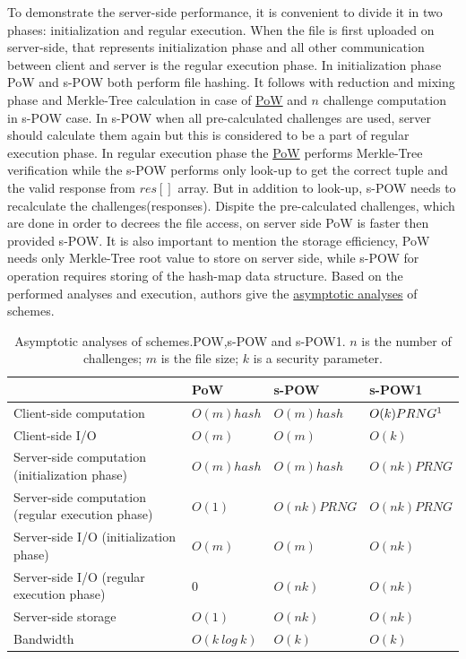 \documentclass[12pt]{article}
\begin{document}
To demonstrate the server-side performance, it is convenient to divide it in two phases: initialization and regular execution. When the file is first uploaded on server-side, that represents initialization phase and all other communication between client and server is the regular execution phase. In initialization phase PoW and s-POW both perform file hashing. It follows with reduction and mixing phase and Merkle-Tree calculation in case of  \hyperref[sub:Soltuion1]{PoW} and $n$ challenge computation in s-POW case. In s-POW when all pre-calculated challenges are used, server should calculate them again but this is considered to be a part of regular execution phase. In regular execution phase the  \hyperref[sub:Soltuion1]{PoW}  performs Merkle-Tree verification while the s-POW performs only look-up to get the correct tuple and the valid response from $res[]$  array. But in addition to look-up, s-POW needs to recalculate the challenges(responses). Dispite the pre-calculated challenges, which are done in order to decrees the file access, on server side PoW is faster then provided s-POW. It is also important to mention the storage efficiency, PoW needs only Merkle-Tree root value to store on server side, while s-POW for operation requires storing of the hash-map data structure.  Based on the performed analyses and execution, authors give the \hyperref[table:asymptoticAnalysis]{asymptotic analyses} of schemes. 


\begin{savenotes}
\begin{table}[!htpb]
\centering
\addtolength{\tabcolsep}{3pt}
\begin{tabular}{|L{6cm}|L{2.5cm}|L{2.5cm}|L{2.5cm}|}
\hline
&PoW&s-POW&s-POW1\\
\hline
Client-side computation&$O(m)hash$ & $O(m)hash$ & $O(k)PRNG\footnote{Pseudorandom number generator}$ \\
\hline
Client-side I/O&$O(m)$&$O(m)$&$O(k)$\\
\hline
Server-side computation (initialization phase)&$O(m) hash$&$O(m) hash$&$O(nk)PRNG$\\
\hline
Server-side computation (regular execution phase)&$O(1)$&$O(nk) PRNG$& $O(nk)PRNG$\\
\hline
Server-side I/O (initialization phase)&$O(m)$&$O(m)$&$O(nk)$\\
\hline
Server-side I/O (regular execution phase)&$0$&$O(nk)$&$O(nk)$\\
\hline
Server-side storage&$O(1)$&$O(nk)$&$O(nk)$\\
\hline
Bandwidth&$O(k\ log\ k)$&$O(k)$&$O(k)$\\
\hline

\end{tabular}
\caption{Asymptotic analyses of schemes.POW,s-POW and s-POW1. $n$ is the number of challenges; $m$ is the file size; $k$ is a security parameter. \cite{DiPietro}}
\label{table:asymptoticAnalysis}
\end{table}
\end{savenotes}
\end{document}
